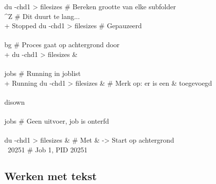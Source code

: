 \begin{bash}
\p[~] du -chd1  > filesizes                    \# Bereken grootte van elke subfolder\\
\textasciicircum Z                                                     \# Dit duurt te lang...\\
\rbrack +  Stopped                 du -chd1 > filesizes     \# Gepauzeerd\\
\\
\p[~] bg                                       \# Proces gaat op achtergrond door\\
\rbrack + du -chd1 > filesizes \&\\
\\
\p[~] jobs                                     \# Running in joblist\\
\rbrack +  Running                 du -chd1 > filesizes \&   \# Merk op: er is een \& toegevoegd\\
\\
\p[~] disown\\
\\
\p[~] jobs                                     \# Geen uitvoer, job is onterfd\\
\\
\p[~] du -chd1  > filesizes \&                  \# Met \& -> Start op achtergrond\\
\rbrack \ 20251                                              \# Job 1, PID 20251\\
\end{bash}

\subsection{Werken met tekst}\label{werken-met-tekst}

